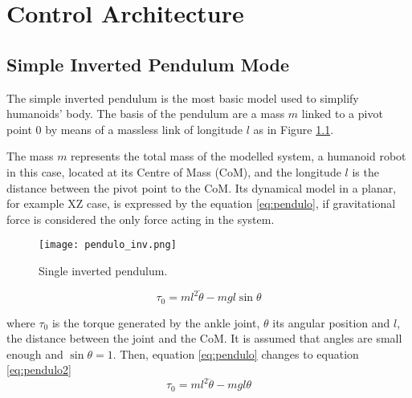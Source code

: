 \chapter{Control Architecture}
\section{Simple Inverted Pendulum Mode}
The simple inverted pendulum is the most basic model used to simplify humanoids' body. The basis of the pendulum are a mass $m$ linked to a pivot point $0$ by means of a massless link of longitude $l$ as in Figure \ref{fig:pendulo_inv}.

The mass $m$ represents the total mass of the modelled system, a humanoid robot in this case, located at its Centre of Mass (CoM), and the longitude $l$ is the distance between the pivot point to the CoM. Its dynamical model in a planar, for example XZ case, is expressed by the equation \ref{eq:pendulo}, if gravitational force is considered the only force acting in the system.

\begin{figure}
\centering
\texttt{[image: pendulo\_inv.png]}
\caption{Single inverted pendulum.}
\label{fig:pendulo_inv}
\end{figure}

\begin{equation}
\tau_0 = ml^2 \ddot{\theta} - mgl\sin\theta
\label{eq:pendulo}
\end{equation}

where $\tau_0$ is the torque generated by the ankle joint, $\theta$ its angular position and $l$, the distance between the joint and the CoM. It is assumed that angles are small enough and $\sin\theta = 1$. Then, equation \ref{eq:pendulo} changes to equation \ref{eq:pendulo2}
\begin{equation}
\tau_0 = ml^2 \ddot{\theta} - mgl\theta
\label{eq:pendulo2}
\end{equation}

